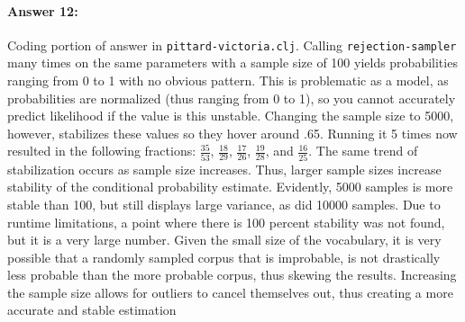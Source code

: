 \documentclass[10pt]{article}
\begin{document}
\paragraph{Answer 12:} Coding portion of answer in \texttt{pittard-victoria.clj}.\newline
Calling \texttt{rejection-sampler} many times on the same parameters with a sample size of 100 yields probabilities ranging from 0 to 1 with no obvious pattern. This is problematic as a model, as probabilities are normalized (thus ranging from 0 to 1), so you  cannot accurately predict likelihood if the value is this unstable. Changing the sample size to 5000, however, stabilizes these values so they hover around .65. Running it 5 times now resulted in the following fractions: $\frac{35}{53}$, $\frac{18}{29}$, $\frac{17}{26}$, $\frac{19}{28}$, and $\frac{16}{25}$. The same trend of stabilization occurs as sample size increases. Thus, larger sample sizes increase stability of the conditional probability estimate. Evidently, 5000 samples is more stable than 100, but still displays large variance, as did 10000 samples. Due to runtime limitations, a point where there is 100 percent stability was not found, but it is a very large number. Given the small size of the vocabulary, it is very possible that a randomly sampled corpus that is improbable, is not drastically less probable than the more probable corpus, thus skewing the results. Increasing the sample size allows for outliers to cancel themselves out, thus creating a more accurate and stable estimation
\end{document}
